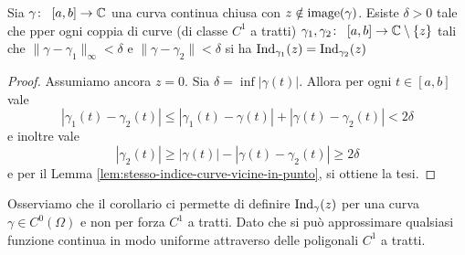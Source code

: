 \begin{corollary}
  Sia $\gamma \colon\ \left[ a,b \right] \rightarrow \mathbb{C}$ una curva continua chiusa
  con $z \notin \operatorname{image}(\gamma)$. Esiste $\delta > 0$ tale che pper ogni
  coppia di curve (di classe $C^1$ a tratti)
  $\gamma_1,\gamma_2 \colon\ \left[ a,b \right] \rightarrow \mathbb{C} \setminus\left\{ z
  \right\}$ tali che $\|\gamma - \gamma_1\|_\infty < \delta$ e $\|\gamma
  - \gamma_2\| < \delta$ si ha $\operatorname{Ind}_{\gamma_1}(z)
= \operatorname{Ind}_{\gamma_2}(z)$
  \label{cor:carabinieri-tra-due-curve-convergenza-indice}
\end{corollary}
\begin{proof}
  Assumiamo ancora $z = 0$. Sia $\delta = \inf |\gamma(t)|$. Allora per ogni
  $t \in \left[ a,b \right]$ vale 
  \begin{equation*}
    |\gamma_1(t) - \gamma_2(t)| \le |\gamma_1(t) - \gamma(t)| + |\gamma(t)
    - \gamma_2(t)| < 2\delta
  \end{equation*}
  e inoltre vale 
  \begin{equation*}
    |\gamma_2(t)| \ge |\gamma(t)| - |\gamma(t) - \gamma_2(t)| \ge
    2\delta
  \end{equation*}
  e per il Lemma \ref{lem:stesso-indice-curve-vicine-in-punto}, si ottiene
  la tesi.
\end{proof}

\begin{remark}
    Osserviamo che il corollario ci permette di definire
    $\operatorname{Ind}_\gamma(z)$ per una curva $\gamma \in C^0(\Omega)$ e non
    per forza $C^1$ a tratti. Dato che si può approssimare qualsiasi funzione
    continua in modo uniforme attraverso delle poligonali $C^1$ a tratti.
    \label{rmk:generalizzazione-indice-curve-chiuse-continue}
\end{remark}

